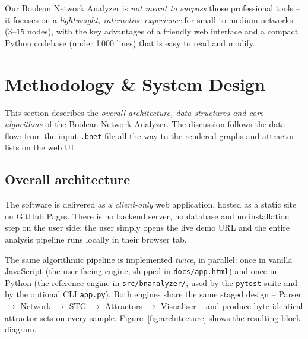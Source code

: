 \documentclass[oneside,final]{hcmut-report}
\begin{document}
Our Boolean Network Analyzer is \textit{not meant to surpass} those professional tools -- it focuses on a \textit{lightweight, interactive experience} for small-to-medium networks (3--15 nodes), with the key advantages of a friendly web interface and a compact Python codebase (under 1\,000 lines) that is easy to read and modify.

\section{Methodology \& System Design}\label{sec:method}

This section describes the \textit{overall architecture, data structures and core algorithms} of the Boolean Network Analyzer. The discussion follows the data flow: from the input \texttt{.bnet} file all the way to the rendered graphs and attractor lists on the web UI.

\subsection{Overall architecture}\label{subsec:arch}

The software is delivered as a \textit{client-only} web application, hosted as a static site on GitHub Pages. There is no backend server, no database and no installation step on the user side: the user simply opens the live demo URL and the entire analysis pipeline runs locally in their browser tab.

The same algorithmic pipeline is implemented \textit{twice}, in parallel: once in vanilla JavaScript (the user-facing engine, shipped in \texttt{docs/app.html}) and once in Python (the reference engine in \texttt{src/bnanalyzer/}, used by the \texttt{pytest} suite and by the optional CLI \texttt{app.py}). Both engines share the same staged design -- Parser $\rightarrow$ Network $\rightarrow$ STG $\rightarrow$ Attractors $\rightarrow$ Visualiser -- and produce byte-identical attractor sets on every sample. Figure~\ref{fig:architecture} shows the resulting block diagram.
\end{document}

